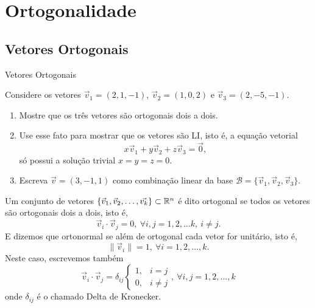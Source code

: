 \section{Ortogonalidade}

\subsection*{Vetores Ortogonais}

\begin{frame}[label=orto]{Vetores Ortogonais}
\begin{exer}
Considere os vetores $\vec{v}_1=(2,1,-1)$, $\vec{v}_2=(1,0,2)$ e $\vec{v}_3=(2,-5,-1)$. 

\begin{enumerate}
\item Mostre que os três vetores são ortogonais dois a dois.

\item Use esse fato para mostrar que os vetores são LI, isto é, a equação vetorial 
\[x\vec{v}_1+y\vec{v}_2+z\vec{v}_3=\vec{0},\]
{\color{red}só possui} a solução trivial $x=y=z=0$.

\item Escreva  $\vec{v}=(3,-1,1)$ como combinação linear da base $\mathcal{B}=\{\vec{v}_1,\vec{v}_2,\vec{v}_3\}$.
\end{enumerate}
\end{exer}

\end{frame}

\begin{frame}[label=orto]{}
\begin{defin}
Um conjunto de vetores $\{\vec{v}_1,\vec{v}_2,\ldots, \vec{v_k}\}\subset \mathbb{R}^n$ é dito {\color{blue}ortogonal} se todos os vetores são ortogonais dois a dois, isto é,
\[\vec{v}_i\cdot \vec{v}_j=0,\ \forall i,j=1,2,\ldots k, \ i\neq j.\]
E dizemos que {\color{blue}ortonormal} se além de ortogonal cada vetor for unitário, isto é, 
\[\|\vec{v}_i\|=1,\ \forall i=1,2,\ldots,k.\]
Neste caso, escrevemos também
\[
\vec{v}_i\cdot \vec{v}_j=\delta_{ij}
\begin{cases}
1, & i=j\\ 0, & i\neq j
\end{cases}, \ \forall i,j=1,2,\ldots,k
\]
onde $\delta_{ij}$ é o chamado {\color{blue}Delta de Kronecker}.
\end{defin}

\end{frame}

